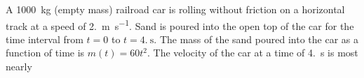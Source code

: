 \documentclass{../../oss-apphys-exam}
\begin{document}
\begin{multicols*}{2}
\begin{questions}
    \question A \SI{1000}{\kilo\gram} (empty mass) railroad car is rolling
    without friction on a horizontal track at a speed of
    \SI{2.}{\metre\per\second}. Sand is poured into the open top of the car for
    the time interval from $t=0$ to $t=\SI{4.}\second$. The mass of the sand
    poured into the car as a function of time is $m(t)=60t^2$. The velocity of
    the car at a time of \SI{4.}{\second} is most nearly
    \columnbreak
    
\end{questions}
\end{multicols*}
\end{document}

